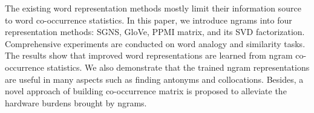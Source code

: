 The existing word representation methods mostly limit their information source to word co-occurrence statistics. In this paper, we introduce ngrams into four representation methods: SGNS, GloVe, PPMI matrix, and its SVD factorization. Comprehensive experiments are conducted on word analogy and similarity tasks. The results show that improved word representations are learned from ngram co-occurrence statistics. We also demonstrate that the trained ngram representations are useful in many aspects such as finding antonyms and collocations. Besides, a novel approach of building co-occurrence matrix is proposed to alleviate the hardware burdens brought by ngrams.
